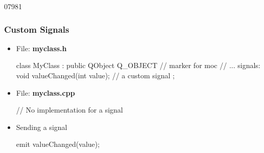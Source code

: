 \begin{slide}[fragile]{07981}\frametitle{Custom Signals}
\label{codeForSignals1}
\begin{itemize}
\item File: \textbf{myclass.h} 
  \begin{cpp}
class MyClass : public QObject 
{
  Q_OBJECT // marker for moc                       
  // ...
signals:
  void valueChanged(int value); // a custom signal
};
  \end{cpp}
\item File: \textbf{myclass.cpp}
  \begin{cpp}
// No implementation for a signal

  \end{cpp}
\item Sending a signal
\begin{cpp}
emit valueChanged(value);
\end{cpp}
\end{itemize}


\end{slide}




